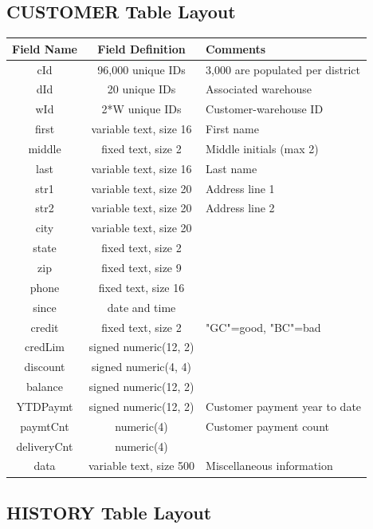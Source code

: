 \subsection{CUSTOMER Table Layout}

\begin{center}
\begin{tabular}{ |c|c|m{7.5cm}| } 
 \hline
 Field Name & Field Definition & Comments \\ 
 \hline
 \rowcolor{gray}
 cId & 96,000 unique IDs & 3,000 are populated per district\\
 \rowcolor{gray}
 dId & 20 unique IDs & Associated warehouse\\
 \rowcolor{gray}
 wId & 2*W unique IDs & Customer-warehouse ID \\ 
 first & variable text, size 16 & First name\\
 middle & fixed text, size 2 & Middle initials (max 2)\\
 last & variable text, size 16 & Last name \\ 
 str1 & variable text, size 20 & Address line 1 \\
 str2 & variable text, size 20 & Address line 2 \\
 city & variable text, size 20 &  \\
 state & fixed text, size 2 & \\
 zip & fixed text, size 9 &  \\
 phone & fixed text, size 16 & \\
 since & date and time & \\
 credit & fixed text, size 2 & "GC"=good, "BC"=bad\\
 credLim & signed numeric(12, 2) & \\
 discount & signed numeric(4, 4) & \\
 balance & signed numeric(12, 2) & \\
 YTDPaymt & signed numeric(12, 2) & Customer payment year to date\\
 paymtCnt & numeric(4) & Customer payment count \\
 deliveryCnt & numeric(4) & \\
 data & variable text, size 500 & Miscellaneous information \\
 \hline
\end{tabular}
\end{center}

\subsection{HISTORY Table Layout}

